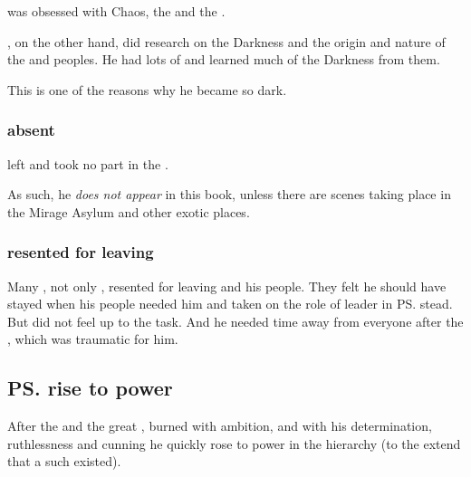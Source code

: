 \Secherdamon{} was obsessed with Chaos, the \xzaishanns{} and the \firstgendragons. 

\Ishnaruchaefir, on the other hand, did research on the Darkness and the origin and nature of the \bane{} and \resphan{} peoples. He had lots of  and learned much of the Darkness from them. 

This is one of the reasons why he became so dark. 






\subsubsection{\Ishnaruchaefir{} absent}
\Ishnaruchaefir{} left \Miith{} and took no part in the \resphanwars. 

As such, he \emph{does not appear} in this book, unless there are scenes taking place in the Mirage Asylum and other exotic places. 






\subsubsection{\Ishnaruchaefir{} resented for leaving}
Many \dragons, not only \Secherdamon, resented \Ishnaruchaefir{} for leaving and  his people.
They felt he should have stayed when his people needed him and taken on the role of leader in \ps{\Nexagglachel} stead. 
But \Ishnaruchaefir{} did not feel up to the task. 
And he needed time away from everyone after the \SecondShrouding, which was traumatic for him. 









\subsection{\ps{\Secherdamon} rise to power}
After the  and the great \secondbanewar, \HriistD{} burned with ambition, and with his determination, ruthlessness and cunning he quickly rose to power in the \draconic{} hierarchy (to the extend that a such existed).

